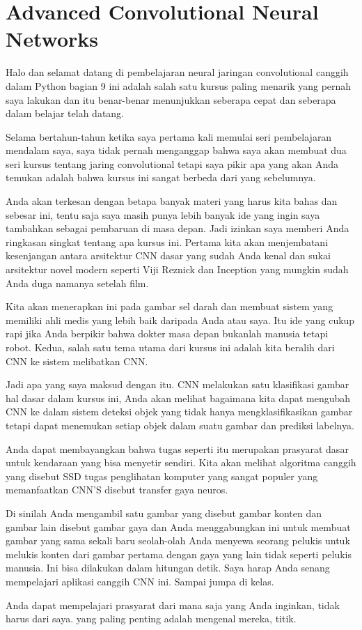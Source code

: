 \chapter{Advanced Convolutional Neural Networks} 

Halo dan selamat datang di pembelajaran neural jaringan convolutional canggih dalam Python bagian 9
ini adalah salah satu kursus paling menarik yang pernah saya lakukan dan itu benar-benar menunjukkan seberapa cepat dan seberapa dalam belajar
telah datang.

Selama bertahun-tahun ketika saya pertama kali memulai seri pembelajaran mendalam saya, saya tidak pernah menganggap bahwa saya akan membuat dua seri
kursus tentang jaring convolutional tetapi saya pikir apa yang akan Anda temukan adalah bahwa kursus ini sangat berbeda
dari yang sebelumnya.

Anda akan terkesan dengan betapa banyak materi yang harus kita bahas dan sebesar ini, tentu saja saya masih
punya lebih banyak ide yang ingin saya tambahkan sebagai pembaruan di masa depan.
Jadi izinkan saya memberi Anda ringkasan singkat tentang apa kursus ini.
Pertama kita akan menjembatani kesenjangan antara arsitektur CNN dasar yang sudah Anda kenal dan sukai
arsitektur novel modern seperti Viji Reznick dan Inception yang mungkin sudah Anda duga namanya
setelah film.

Kita akan menerapkan ini pada gambar sel darah dan membuat sistem yang memiliki ahli medis yang lebih baik
daripada Anda atau saya.
Itu ide yang cukup rapi jika Anda berpikir bahwa dokter masa depan bukanlah manusia tetapi robot.
Kedua, salah satu tema utama dari kursus ini adalah kita beralih dari CNN ke sistem
melibatkan CNN.

Jadi apa yang saya maksud dengan itu.
CNN melakukan satu klasifikasi gambar hal dasar dalam kursus ini, Anda akan melihat bagaimana kita dapat mengubah CNN
ke dalam sistem deteksi objek yang tidak hanya mengklasifikasikan gambar tetapi dapat menemukan setiap objek dalam suatu gambar
dan prediksi labelnya.

Anda dapat membayangkan bahwa tugas seperti itu merupakan prasyarat dasar untuk kendaraan yang bisa menyetir sendiri.
Kita akan melihat algoritma canggih yang disebut SSD tugas penglihatan komputer yang sangat populer
yang memanfaatkan CNN'S disebut transfer gaya neuros.

Di sinilah Anda mengambil satu gambar yang disebut gambar konten dan gambar lain disebut gambar gaya
dan Anda menggabungkan ini untuk membuat gambar yang sama sekali baru seolah-olah Anda menyewa seorang pelukis untuk melukis konten
dari gambar pertama dengan gaya yang lain tidak seperti pelukis manusia.
Ini bisa dilakukan dalam hitungan detik.
Saya harap Anda senang mempelajari aplikasi canggih CNN ini.
Sampai jumpa di kelas.

Anda dapat mempelajari prasyarat dari mana saja yang Anda inginkan, tidak harus dari saya. yang paling penting adalah mengenal mereka, titik.
